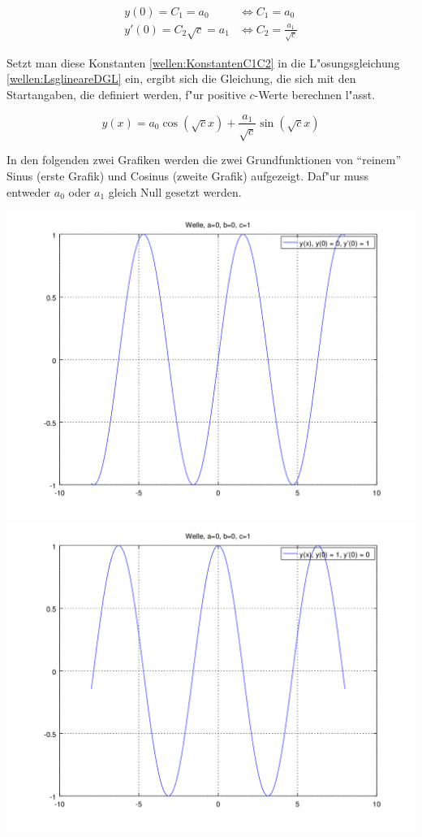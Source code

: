 \begin{refsection}
\begin{equation}
	\begin{split}
		y(0) = C_1 = a_0 &\Leftrightarrow C_1 = a_0 \\
		y'(0) = C_2 \sqrt{c} = a_1 &\Leftrightarrow C_2 = \frac{a_1}{\sqrt{c}}
	\end{split}
	\label{wellen:KonstantenC1C2}
\end{equation}

Setzt man diese Konstanten \ref{wellen:KonstantenC1C2} in die L"osungsgleichung 
\ref{wellen:LsglineareDGL} 
ein, ergibt sich die Gleichung, die sich mit den Startangaben, die definiert 
werden, f"ur positive $c$-Werte berechnen l"asst.

\begin{equation}
	y(x) = a_0 \cos(\sqrt{c}x) + \frac{a_1}{\sqrt{c}} \sin(\sqrt{c}x)
	\label{wellen:LSGleichung}
\end{equation}

In den folgenden zwei Grafiken werden die zwei Grundfunktionen von ``reinem''
Sinus (erste Grafik) und Cosinus (zweite Grafik) aufgezeigt. Daf"ur muss 
entweder $a_0$ oder $a_1$ gleich Null gesetzt werden.

\noindent
\includegraphics[scale=0.35]{./wellen/octave/images/grundfunktionen/sin.png}
\includegraphics[scale=0.35]{./wellen/octave/images/grundfunktionen/cos.png}


\end{refsection}
